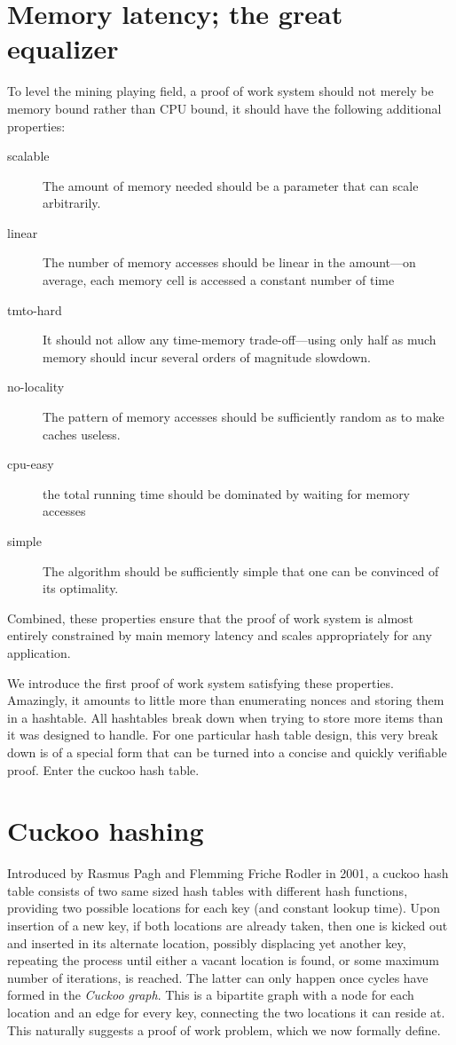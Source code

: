 \documentclass[11pt, oneside]{article}
\begin{document}
\section{Memory latency; the great equalizer}
To level the mining playing field, a proof of work system should not merely be memory bound rather
than CPU bound, it should have the following additional properties:
\begin{description}
\item[scalable] The amount of memory needed should be a parameter that can scale arbitrarily.
\item[linear] The number of memory accesses should be linear in the amount---on average,
each memory cell is accessed a constant number of time
\item[tmto-hard] It should not allow any time-memory trade-off---using only half as much memory should incur
several orders of magnitude slowdown.
\item[no-locality] The pattern of memory accesses should be sufficiently random as to make caches useless.
\item[cpu-easy] the total running time should be dominated by waiting for memory accesses
\item[simple] The algorithm should be sufficiently simple that one can be convinced of its optimality.
\end{description}
Combined, these properties ensure that the proof of work system is almost entirely constrained by main
memory latency and scales appropriately for any application.

We introduce the first proof of work system satisfying these properties.
Amazingly, it amounts to little more than enumerating nonces and storing them
in a hashtable. All hashtables break down when trying to store more items than
it was designed to handle. For one particular hash table design, this very break down
is of a special form that can be turned into a concise and quickly verifiable proof.
Enter the cuckoo hash table.

\section{Cuckoo hashing}
Introduced by Rasmus Pagh and Flemming Friche Rodler in
2001\cite{Pagh01cuckoohashing}, a cuckoo hash table consists of two same sized
hash tables with different hash functions,
providing two possible locations for each key (and constant lookup time).
Upon insertion of a new key, if both locations are already taken,
then one is kicked out and inserted in its alternate location, possibly
displacing yet another key, repeating the process until either a vacant
location is found, or some maximum number of iterations,
is reached. The latter can only happen once cycles have formed in the {\em
Cuckoo graph}.  This is a bipartite graph with a node for each location and an
edge for every key,
connecting the two locations it can reside at. This naturally suggests a proof
of work problem, which we now formally define.
\end{document}
